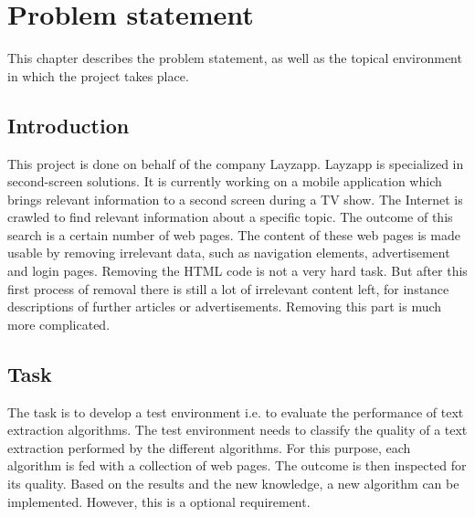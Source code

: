 
\chapter{Problem statement} %

\label{Problem statement} %



This chapter describes the problem statement, as well as the topical environment in which the project takes place.



\section{Introduction}

This project is done on behalf of the company Layzapp. Layzapp is specialized in second-screen solutions. It is currently working on a mobile application which brings relevant information to a second screen during a TV show. The Internet is crawled to find relevant information about a specific topic. The outcome of this search is a certain number of web pages. The content of these web pages is made usable by removing irrelevant data, such as navigation elements, advertisement and login pages. Removing the HTML code is not a very hard task. But after this first process of removal there is still a lot of irrelevant content left, for instance descriptions of further articles or advertisements. Removing this part is much more complicated. 

\section{Task}

The task is to develop a test environment i.e. to evaluate the performance of text extraction algorithms. The test environment needs to classify the quality of a text extraction performed by the different algorithms. For this purpose, each algorithm is fed with a collection of web pages. The outcome is then inspected for its quality. Based on the results and the new knowledge, a new algorithm can be implemented. However, this is a optional requirement.


